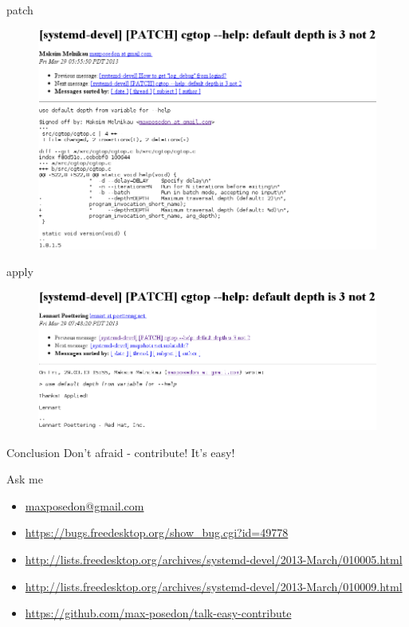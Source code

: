 \documentclass{beamer}
\begin{document}
\begin{frame}[fragile]{patch}
    \begin{figure}[htb]
        \includegraphics[width=1\textwidth]{patch.png}
    \end{figure}
\end{frame}

\begin{frame}[fragile]{apply}
    \begin{figure}[htb]
        \includegraphics[width=1\textwidth]{apply.png}
    \end{figure}
\end{frame}

\begin{frame}[fragile]{Conclusion}
    Don't afraid - contribute! It's easy!
\end{frame}

\begin{frame}[fragile]{Ask me}
    \begin{itemize}
    \item \href{mailto:maxposedon@gmail.com}{maxposedon@gmail.com}
    \item \url{https://bugs.freedesktop.org/show\_bug.cgi?id=49778}
    \item \url{http://lists.freedesktop.org/archives/systemd-devel/2013-March/010005.html}
    \item \url{http://lists.freedesktop.org/archives/systemd-devel/2013-March/010009.html}
    \item \url{https://github.com/max-posedon/talk-easy-contribute}
    \end{itemize}
\end{frame}
\end{document}
